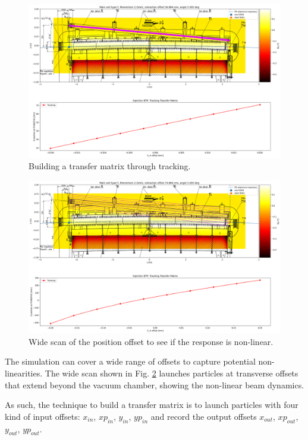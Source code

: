 \begin{figure}[H]
\centering
\includegraphics[width=1.0\textwidth]{02_Simulation/images/injection_transfer_matrix_1.png}
\caption{Building a transfer matrix through tracking.}
\label{fig:transfer_matrix_1}
\end{figure}

\begin{figure}[H]
\centering
\includegraphics[width=1.0\textwidth]{02_Simulation/images/injection_transfer_matrix_2.png}
\caption{Wide scan of the position offset to see if the response is non-linear.}
\label{fig:transfer_matrix_2}
\end{figure}


The simulation can cover a wide range of offsets to capture potential non-linearities. The wide scan shown in Fig. \ref{fig:transfer_matrix_2} launches particles at transverse offsets that extend beyond the vacuum chamber, showing the non-linear beam dynamics.

As such, the technique to build a transfer matrix is to launch particles with four kind of input offsets: $x_{in}$, $xp_{in}$, $y_{in}$, $yp_{in}$ and record the output offsets $x_{out}$, $xp_{out}$, $y_{out}$, $yp_{out}$.

